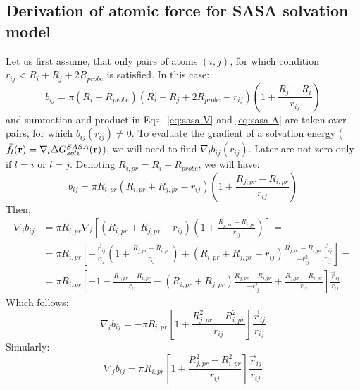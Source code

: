 \documentclass[11pt]{book}
\begin{document}
\subsection{Derivation of atomic force for SASA solvation model}
Let us first assume, that only pairs of atoms $(i,j)$, for which condition $r_{ij}<R_{i}+R_{j}+2R_{probe}$ is satisfied. In this case:
\begin{equation}\label{eq:sasa-f1}
b_{ij}=\pi\left(R_{i}+R_{probe}\right)\left(R_{i}+R_{j}+2R_{probe}-r_{ij}\right)\left(1+\frac{R_{j}-R_{i}}{r_{ij}}\right)
\end{equation}
and summation and product in Eqs.~\ref{eq:sasa-V} and \ref{eq:sasa-A} are taken over pairs, for which $b_{ij}(r_{ij})\ne 0$. To evaluate the gradient of a solvation energy ($\vec{f}_{l}({\bf r})=\nabla_{l}\Delta G_{solv}^{SASA}({\bf r})$), we will need to find $\nabla_{l}b_{ij}(r_{ij})$. Later are not zero only if $l=i$ or $l=j$. Denoting $R_{i,pr}=R_{i}+R_{probe}$, we will have:
\begin{equation}\label{eq:sasa-f2}
b_{ij}=\pi R_{i,pr}\left(R_{i,pr}+R_{j,pr}-r_{ij}\right)\left(1+\frac{R_{j,pr}-R_{i,pr}}{r_{ij}}\right)
\end{equation}
Then,
\begin{equation}\label{eq:sasa-f3}
\begin{split}
\nabla_{i}b_{ij}&=\pi R_{i,pr}\nabla_{i}\left[\left(R_{i,pr}+R_{j,pr}-r_{ij}\right)\left(1+\frac{R_{j,pr}-R_{i,pr}}{r_{ij}}\right)\right] = \\
&=\pi R_{i,pr}\left[-\frac{\vec{r}_{ij}}{r_{ij}}\left(1+\frac{R_{j,pr}-R_{i,pr}}{r_{ij}}\right)+\left(R_{i,pr}+R_{j,pr}-r_{ij}\right)\frac{R_{j,pr}-R_{i,pr}}{-r_{ij}^{2}}\frac{\vec{r}_{ij}}{r_{ij}}\right] =\\
&=\pi R_{i,pr}\left[-1-\frac{R_{j,pr}-R_{i,pr}}{r_{ij}}-\left(R_{i,pr}+R_{j,pr}\right)\frac{R_{j,pr}-R_{i,pr}}{-r_{ij}^{2}}+\frac{R_{j,pr}-R_{i,pr}}{r_{ij}}\right]\frac{\vec{r}_{ij}}{r_{ij}}
\end{split}
\end{equation}
Which follows:
\begin{equation}\label{eq:sasa-f4}
\nabla_{i}b_{ij}=-\pi R_{i,pr}\left[1+\frac{R_{j,pr}^{2}-R_{i,pr}^{2}}{r_{ij}}\right]\frac{\vec{r}_{ij}}{r_{ij}}
\end{equation}
Simularly:
\begin{equation}\label{eq:sasa-f5}
\nabla_{j}b_{ij}=\pi R_{i,pr}\left[1+\frac{R_{j,pr}^{2}-R_{i,pr}^{2}}{r_{ij}}\right]\frac{\vec{r}_{ij}}{r_{ij}}
\end{equation}
\end{document}
